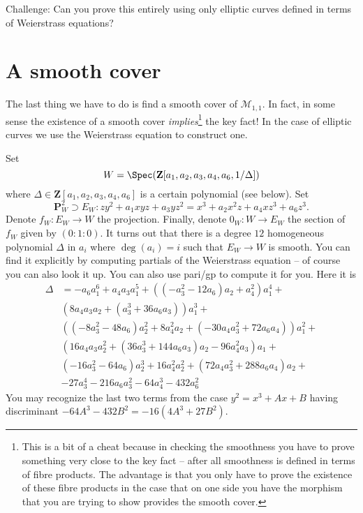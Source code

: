 \medskip\noindent
Challenge: Can you prove this entirely using only elliptic curves
defined in terms of Weierstrass equations?




\section{A smooth cover}
\label{section-smooth}

\noindent
The last thing we have to do is find a smooth cover of $\mathcal{M}_{1, 1}$.
In fact, in some sense the existence of a smooth cover
{\it implies}\footnote{This is a bit of a cheat because
in checking the smoothness you have to prove something very close to
the key fact -- after all smoothness is defined in terms of
fibre products. The advantage is that you only have to prove the existence
of these fibre products in the case that on one side you have the morphism
that you are trying to show provides the smooth cover.} the key fact!
In the case of elliptic curves we use the Weierstrass equation to
construct one.

\medskip\noindent
Set
$$
W = \Spec(\mathbf{Z}[a_1, a_2, a_3, a_4, a_6, 1/\Delta])
$$
where $\Delta \in \mathbf{Z}[a_1, a_2, a_3, a_4, a_6]$ is a certain
polynomial (see below). Set
$$
\mathbf{P}_W^2 \supset E_W :
zy^2 + a_1 xyz + a_3 yz^2 = x^3 + a_2x^2z + a_4xz^3 + a_6z^3.
$$
Denote $f_W : E_W \to W$ the projection. Finally, denote $0_W : W \to E_W$
the section of $f_W$ given by $(0 : 1 : 0)$. It turns out that
there is a degree $12$ homogeneous polynomial $\Delta$ in $a_i$
where $\deg(a_i) = i$ such that $E_W \to W$ is smooth.
You can find it explicitly by computing partials of the
Weierstrass equation -- of course you can also look it up. You can
also use pari/gp to compute it for you. Here it is
\begin{align*}
\Delta & = -a_6a_1^6 + a_4a_3a_1^5 + ((-a_3^2 - 12a_6)a_2 + a_4^2)a_1^4 + \\
& (8a_4a_3a_2 + (a_3^3 + 36a_6a_3))a_1^3 + \\
& ((-8a_3^2 - 48a_6)a_2^2 + 8a_4^2a_2 + (-30a_4a_3^2 + 72a_6a_4))a_1^2 + \\
& (16a_4a_3a_2^2 + (36a_3^3 + 144a_6a_3)a_2 - 96a_4^2a_3)a_1 + \\
& (-16a_3^2 - 64a_6)a_2^3 + 16a_4^2a_2^2 + (72a_4a_3^2 + 288a_6a_4)a_2 + \\
& -27a_3^4 - 216a_6a_3^2  -64a_4^3 - 432a_6^2
\end{align*}
You may recognize the last two terms from the case
$y^2 = x^3 + Ax + B$ having discriminant $-64A^3 - 432B^2 = -16(4A^3 + 27B^2)$.

